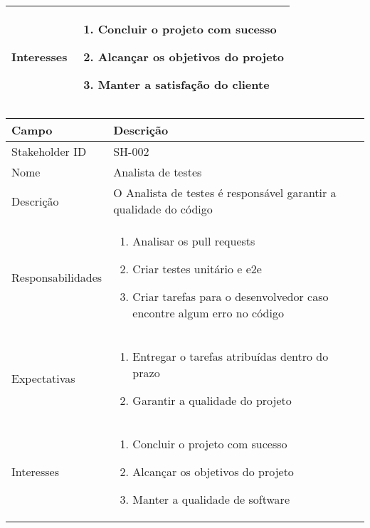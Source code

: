 \begin{tabularx}{\textwidth}{| l | X |}
    \\ \hline
    Interesses        & 
    \begin{enumerate}
        \item Concluir o projeto com sucesso
        \item Alcançar os objetivos do projeto
        \item Manter a satisfação do cliente
    \end{enumerate}

    \\ \hline    
\end{tabularx}

\vspace{1cm}

\noindent
\begin{tabularx}{\textwidth}{| l | X |}
\hline
Campo             & Descrição                                                                                                                                                                           \\ \hline
Stakeholder ID    & SH-002                                                                                                                                                                              \\ \hline
Nome              & Analista de testes                                                                                                                                                                       \\ \hline
Descrição         & O Analista de testes é responsável garantir a qualidade do código
\\ \hline
Responsabilidades & 
\begin{enumerate}
    \item Analisar os pull requests
    \item Criar testes unitário e e2e
    \item Criar tarefas para o desenvolvedor caso encontre algum erro no código
\end{enumerate}
\\ \hline

Expectativas      &
\begin{enumerate}
    \item Entregar o tarefas atribuídas dentro do prazo
    \item Garantir a qualidade do projeto
\end{enumerate}
\\ \hline

Interesses        &
\begin{enumerate}
    \item Concluir o projeto com sucesso
    \item Alcançar os objetivos do projeto
    \item Manter a qualidade de software
\end{enumerate}
\\ \hline

\end{tabularx}

